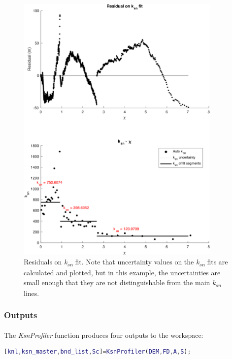 \begin{figure}[H]
	\centering
	\includegraphics[width=10cm]{PNGs/B92_StreamRsds_9.png}
	\caption{Residuals on \textit{k\textsubscript{sn}} fit. Note that uncertainty values on the \textit{k\textsubscript{sn}} fits are calculated and plotted, but in this example, the uncertainties are small enough that they are not distinguishable from the main \textit{k\textsubscript{sn}} lines.} 
	\label{fig:ProfilerRes}
\end{figure}

\subsubsection{Outputs}
\paragraph{}The \textit{KsnProfiler} function produces four outputs to the workspace:

\begin{lstlisting}[language=Matlab]
[knl,ksn_master,bnd_list,Sc]=KsnProfiler(DEM,FD,A,S);
\end{lstlisting}

